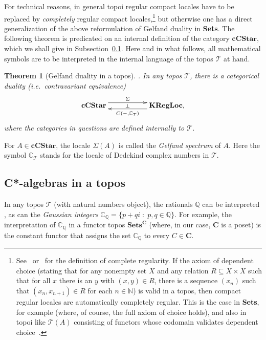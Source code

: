 \documentclass[12pt]{article}
\newcommand{\Q}{\mathbb{Q}}
\newcommand{\Sets}{\mbox{\textbf{Sets}}}
\newcommand{\Sg}{\Sigma} \newcommand{\ta}{\tau} \newcommand{\ph}{\phi}
\newcommand{\CT}{{\mathcal T}} \newcommand{\CV}{{\mathcal V}}
\newcommand{\C}{{\mathbb C}} \newcommand{\D}{{\mathbb D}}
\newcommand{\alg}[1]{\ensuremath{#1}}
\newcommand{\cat}[1]{\ensuremath{\mathbf{#1}}}
\newcommand{\Cat}[1]{\ensuremath{\mathrm{\textbf{#1}}}}
\newcommand{\Ccstar}{\Cat{cCStar}\xspace}
\newcommand{\Set}{\Cat{Sets}\xspace}
\newcommand{\cpxrat}{\ensuremath{\field{C}_\field{Q}}}
\newcommand{\asstopos}{\ensuremath{\mathcal{T}}}
\newcommand{\field}[1]{\ensuremath{\mathbb{#1}}}
\newcommand{\TA}{\mathcal{T}(A)}
\newcommand{\ie}{\textit{i.e.}}
\renewcommand{\TA}{\asstopos(\alg{A})}
\newtheorem{theorem}{Theorem}
\begin{document}
For technical reasons, in general topoi regular compact locales have to be
replaced by
{\it completely} regular compact
locales,\footnote{See~\cite{johnstone82}
or~\cite{banaschewskimulvey06} for the definition of complete
regularity.  If the axiom of dependent choice  (stating that for any
nonempty set $X$ and any relation $R \subseteq X\times X$ such that
for all $x$ there is an $y$ with $(x,y) \in R$, there is a sequence
$(x_n)$ such that $(x_n,x_{n+1}) \in R$ for each $n \in \field{N}$)
is valid in a topos, then compact regular locales are automatically
completely regular. This is the case in  \Sets, for example (where, of
course, the full axiom of choice holds), and also in topoi like $\TA$
consisting of functors whose codomain validates dependent
choice~\cite{fourmanscedrov82}.\label{footnote:completelyregular}}
  but otherwise one has a direct generalization of the above reformulation of
Gelfand duality in \Sets. The following theorem is predicated on an internal
definition of the category $\Ccstar$, which we shall give in
Subsection~\ref{subsec:cstaralgebras}. Here and in what follows, all
mathematical symbols are to be interpreted in the internal language of the topos
$\CT$ at hand.
\begin{theorem}[Gelfand duality in a topos]\emph{\cite{banaschewskimulvey00b,
banaschewskimulvey00a, banaschewskimulvey06}}.
\label{thm:gelfandrepresentation}
  In any topos $\CT$, there is a categorical duality (\ie\ contravariant
equivalence)
  \[\xymatrix{
       \Ccstar \ar@<1ex>^-{\Sg}[rr] \ar@{}|-{\perp}[rr]
    && \Cat{KRegLoc}, \ar@<1ex>^-{C(-,\field{C}_{\CT})}[ll]
  }\]
where the categories in questions are defined internally to $\CT$.
\end{theorem}
  For $A\in \Ccstar$, the locale $\Sg(\alg{A})$ is called the \emph{Gelfand
spectrum} of
  \alg{A}.
     Here the symbol $\C_{\CT}$ stands for the locale of Dedekind complex
     numbers in $\CT$.
\subsection{C*-algebras in a topos}
\label{subsec:cstaralgebras}
In any topos $\CT$ (with natural numbers object), the rationals $\Q$ can be
interpreted
\cite[\S~VI.8]{maclanemoerdijk92}, as can  the  {\it Gaussian integers}
\hbox{$\cpxrat = \{ p+qi \;:\; p,q \in\field{Q} \}$}.
For example, the interpretation of $\cpxrat$ in a functor topos
$\Set^{\cat{C}}$ (where, in our case, $\cat{C}$ is a poset) is the
constant functor that assigns the set  $\cpxrat$ to every $C \in
\cat{C}$.
\end{document}
